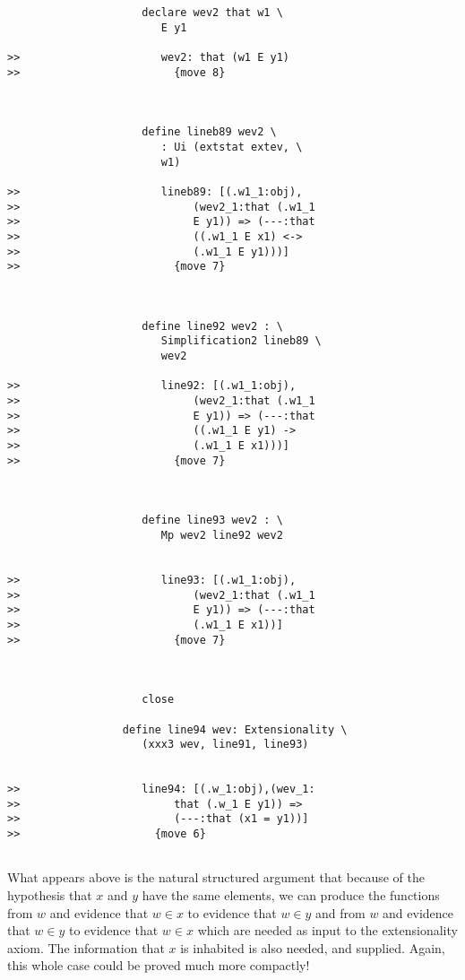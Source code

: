 \documentclass{article}
\begin{document}
{\begin{verbatim}
                     declare wev2 that w1 \
                        E y1

>>                      wev2: that (w1 E y1)
>>                        {move 8}



                     define lineb89 wev2 \
                        : Ui (extstat extev, \
                        w1)

>>                      lineb89: [(.w1_1:obj),
>>                           (wev2_1:that (.w1_1
>>                           E y1)) => (---:that
>>                           ((.w1_1 E x1) <->
>>                           (.w1_1 E y1)))]
>>                        {move 7}



                     define line92 wev2 : \
                        Simplification2 lineb89 \
                        wev2

>>                      line92: [(.w1_1:obj),
>>                           (wev2_1:that (.w1_1
>>                           E y1)) => (---:that
>>                           ((.w1_1 E y1) ->
>>                           (.w1_1 E x1)))]
>>                        {move 7}



                     define line93 wev2 : \
                        Mp wev2 line92 wev2


>>                      line93: [(.w1_1:obj),
>>                           (wev2_1:that (.w1_1
>>                           E y1)) => (---:that
>>                           (.w1_1 E x1))]
>>                        {move 7}



                     close

                  define line94 wev: Extensionality \
                     (xxx3 wev, line91, line93)


>>                   line94: [(.w_1:obj),(wev_1:
>>                        that (.w_1 E y1)) =>
>>                        (---:that (x1 = y1))]
>>                     {move 6}


\end{verbatim}

What appears above is the natural structured argument that because of the hypothesis that $x$ and $y$ have the same elements, we can produce the functions from 
$w$ and evidence that $w \in x$ to evidence that $w \in y$ and from $w$ and evidence that $w \in y$ to evidence that $w \in x$ which are needed as input to the extensionality axiom.
The information that $x$ is inhabited is also needed, and supplied.  Again, this whole case could be proved much more compactly!

}
\end{document}
